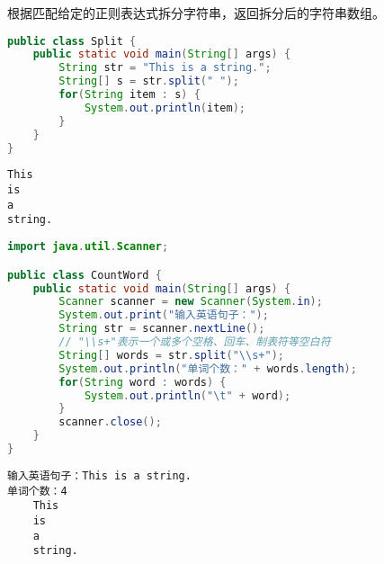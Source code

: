 根据匹配给定的正则表达式拆分字符串，返回拆分后的字符串数组。 \\


\begin{lstlisting}[language=Java]
public class Split {
	public static void main(String[] args) {
		String str = "This is a string.";
		String[] s = str.split(" ");
		for(String item : s) {
			System.out.println(item);
		}
	}
}
\end{lstlisting}

\begin{tcolorbox}
	\begin{verbatim}
This
is
a
string.
	\end{verbatim}
\end{tcolorbox}

\vspace{0.5cm}


\begin{lstlisting}[language=Java]
import java.util.Scanner;

public class CountWord {
	public static void main(String[] args) {
		Scanner scanner = new Scanner(System.in);
		System.out.print("输入英语句子：");
		String str = scanner.nextLine();
		// "\\s+"表示一个或多个空格、回车、制表符等空白符
		String[] words = str.split("\\s+");
		System.out.println("单词个数：" + words.length);
		for(String word : words) {
			System.out.println("\t" + word);
		}
		scanner.close();
	}
}
\end{lstlisting}

\begin{tcolorbox}
	\begin{verbatim}
输入英语句子：This is a string.
单词个数：4
	This
	is
	a
	string.
	\end{verbatim}
\end{tcolorbox}

\newpage
